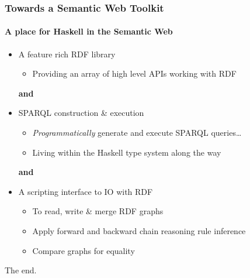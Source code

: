\documentclass{beamer}
\begin{document}
\begin{frame}
\frametitle{Towards a Semantic Web Toolkit}
\framesubtitle{A place for Haskell in the Semantic Web}

\begin{itemize}
\item A feature rich RDF library
  
  \begin{itemize}
  \item Providing an array of high level APIs working with RDF
  \end{itemize}
  
  \begin{center}\textbf{and}\end{center}
  
\item SPARQL construction \& execution
  
  \begin{itemize}
  \item \emph{Programmatically} generate and execute SPARQL
    queries\ldots
  \item Living within the Haskell type system along the way
  \end{itemize}
  
  \begin{center}\textbf{and}\end{center}
  
\item A scripting interface to IO with RDF
  
  \begin{itemize}
  \item To read, write \& merge RDF graphs
  \item Apply forward and backward chain reasoning rule inference
  \item Compare graphs for equality
    
  \end{itemize}
  
\end{itemize}

\end{frame}

\begin{frame}

\huge
\begin{center}
The end.
\end{center}

\end{frame}
\end{document}

